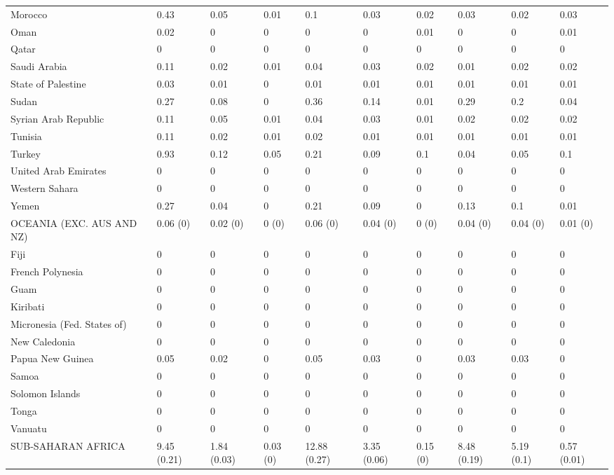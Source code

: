 \begin{longtable}[t]{llllllllll}
Morocco & 0.43 & 0.05 & 0.01 & 0.1 & 0.03 & 0.02 & 0.03 & 0.02 & 0.03\\
Oman & 0.02 & 0 & 0 & 0 & 0 & 0.01 & 0 & 0 & 0.01\\
Qatar & 0 & 0 & 0 & 0 & 0 & 0 & 0 & 0 & 0\\
Saudi Arabia & 0.11 & 0.02 & 0.01 & 0.04 & 0.03 & 0.02 & 0.01 & 0.02 & 0.02\\
State of Palestine & 0.03 & 0.01 & 0 & 0.01 & 0.01 & 0.01 & 0.01 & 0.01 & 0.01\\
Sudan & 0.27 & 0.08 & 0 & 0.36 & 0.14 & 0.01 & 0.29 & 0.2 & 0.04\\
Syrian Arab Republic & 0.11 & 0.05 & 0.01 & 0.04 & 0.03 & 0.01 & 0.02 & 0.02 & 0.02\\
Tunisia & 0.11 & 0.02 & 0.01 & 0.02 & 0.01 & 0.01 & 0.01 & 0.01 & 0.01\\
Turkey & 0.93 & 0.12 & 0.05 & 0.21 & 0.09 & 0.1 & 0.04 & 0.05 & 0.1\\
United Arab Emirates & 0 & 0 & 0 & 0 & 0 & 0 & 0 & 0 & 0\\
Western Sahara & 0 & 0 & 0 & 0 & 0 & 0 & 0 & 0 & 0\\
Yemen & 0.27 & 0.04 & 0 & 0.21 & 0.09 & 0 & 0.13 & 0.1 & 0.01\\
OCEANIA (EXC. AUS AND NZ) & 0.06 (0) & 0.02 (0) & 0 (0) & 0.06 (0) & 0.04 (0) & 0 (0) & 0.04 (0) & 0.04 (0) & 0.01 (0)\\
Fiji & 0 & 0 & 0 & 0 & 0 & 0 & 0 & 0 & 0\\
French Polynesia & 0 & 0 & 0 & 0 & 0 & 0 & 0 & 0 & 0\\
Guam & 0 & 0 & 0 & 0 & 0 & 0 & 0 & 0 & 0\\
Kiribati & 0 & 0 & 0 & 0 & 0 & 0 & 0 & 0 & 0\\
Micronesia (Fed. States of) & 0 & 0 & 0 & 0 & 0 & 0 & 0 & 0 & 0\\
New Caledonia & 0 & 0 & 0 & 0 & 0 & 0 & 0 & 0 & 0\\
Papua New Guinea & 0.05 & 0.02 & 0 & 0.05 & 0.03 & 0 & 0.03 & 0.03 & 0\\
Samoa & 0 & 0 & 0 & 0 & 0 & 0 & 0 & 0 & 0\\
Solomon Islands & 0 & 0 & 0 & 0 & 0 & 0 & 0 & 0 & 0\\
Tonga & 0 & 0 & 0 & 0 & 0 & 0 & 0 & 0 & 0\\
Vanuatu & 0 & 0 & 0 & 0 & 0 & 0 & 0 & 0 & 0\\
SUB-SAHARAN AFRICA & 9.45 (0.21) & 1.84 (0.03) & 0.03 (0) & 12.88 (0.27) & 3.35 (0.06) & 0.15 (0) & 8.48 (0.19) & 5.19 (0.1) & 0.57 (0.01)\\

\end{longtable}
